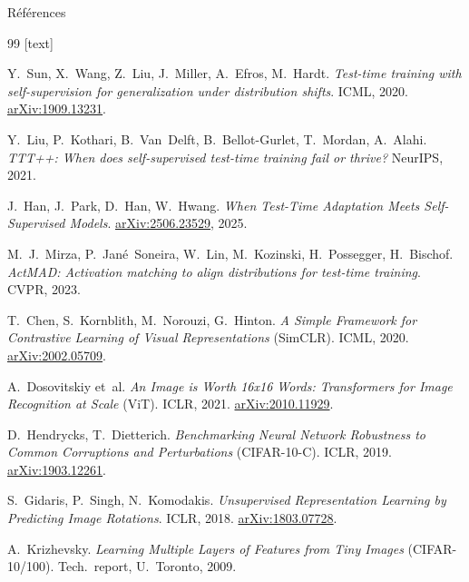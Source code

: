 \documentclass[10pt,aspectratio=169]{beamer}
\begin{document}
\begin{frame}[allowframebreaks]{Références}
  \footnotesize
  \begin{thebibliography}{99}
    [text]

      Y.~Sun, X.~Wang, Z.~Liu, J.~Miller, A.~Efros, M.~Hardt.
      \newblock \emph{Test-time training with self-supervision for generalization under distribution shifts}.
      \newblock ICML, 2020. \href{https://arxiv.org/abs/1909.13231}{arXiv:1909.13231}.

      Y.~Liu, P.~Kothari, B.~Van~Delft, B.~Bellot-Gurlet, T.~Mordan, A.~Alahi.
      \newblock \emph{TTT++: When does self-supervised test-time training fail or thrive?}
      \newblock NeurIPS, 2021.

      J.~Han, J.~Park, D.~Han, W.~Hwang.
      \newblock \emph{When Test-Time Adaptation Meets Self-Supervised Models}.
      \newblock \href{https://arxiv.org/abs/2506.23529}{arXiv:2506.23529}, 2025.

      M.~J.~Mirza, P.~Jané~Soneira, W.~Lin, M.~Kozinski, H.~Possegger, H.~Bischof.
      \newblock \emph{ActMAD: Activation matching to align distributions for test-time training}.
      \newblock CVPR, 2023.

      T.~Chen, S.~Kornblith, M.~Norouzi, G.~Hinton.
      \newblock \emph{A Simple Framework for Contrastive Learning of Visual Representations} (SimCLR).
      \newblock ICML, 2020. \href{https://arxiv.org/abs/2002.05709}{arXiv:2002.05709}.

      A.~Dosovitskiy et~al.
      \newblock \emph{An Image is Worth 16x16 Words: Transformers for Image Recognition at Scale} (ViT).
      \newblock ICLR, 2021. \href{https://arxiv.org/abs/2010.11929}{arXiv:2010.11929}.

      D.~Hendrycks, T.~Dietterich.
      \newblock \emph{Benchmarking Neural Network Robustness to Common Corruptions and Perturbations} (CIFAR-10-C).
      \newblock ICLR, 2019. \href{https://arxiv.org/abs/1903.12261}{arXiv:1903.12261}.

      S.~Gidaris, P.~Singh, N.~Komodakis.
      \newblock \emph{Unsupervised Representation Learning by Predicting Image Rotations}.
      \newblock ICLR, 2018. \href{https://arxiv.org/abs/1803.07728}{arXiv:1803.07728}.

      A.~Krizhevsky.
      \newblock \emph{Learning Multiple Layers of Features from Tiny Images} (CIFAR-10/100).
      \newblock Tech.~report, U.~Toronto, 2009.

  \end{thebibliography}
\end{frame}
\end{document}
